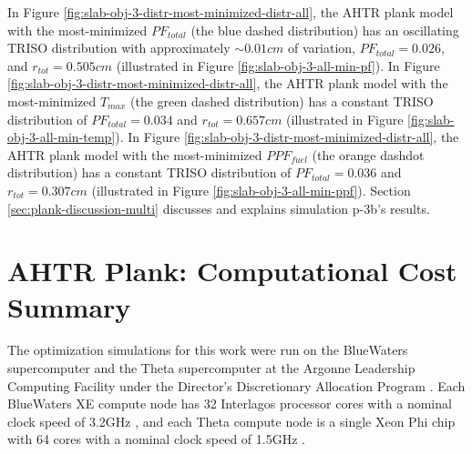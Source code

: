 In Figure \ref{fig:slab-obj-3-distr-most-minimized-distr-all}, the \gls{AHTR} plank model 
with the most-minimized $PF_{total}$ (the blue dashed distribution) has an 
oscillating TRISO distribution with approximately $\sim0.01cm$ of variation, 
$PF_{total} = 0.026$, and $r_{tot}=0.505cm$ (illustrated in Figure 
\ref{fig:slab-obj-3-all-min-pf}).
In Figure \ref{fig:slab-obj-3-distr-most-minimized-distr-all}, the \gls{AHTR} plank 
model with the most-minimized $T_{max}$ (the green dashed distribution) has a constant 
TRISO distribution of $PF_{total}=0.034$ and $r_{tot}=0.657cm$
(illustrated in Figure \ref{fig:slab-obj-3-all-min-temp}).
In Figure \ref{fig:slab-obj-3-distr-most-minimized-distr-all}, the \gls{AHTR} plank 
model with the most-minimized $PPF_{fuel}$ (the orange dashdot distribution) has a 
constant TRISO distribution of $PF_{total} = 0.036$ and $r_{tot}=0.307cm$
(illustrated in Figure \ref{fig:slab-obj-3-all-min-ppf}).
Section \ref{sec:plank-discussion-multi} discusses and explains simulation p-3b's 
results.

\section{AHTR Plank: Computational Cost Summary}
\label{sec:plank-compute-cost}
The optimization simulations for this work were run on the BlueWaters supercomputer 
\cite{ncsa_about_2017} and the Theta supercomputer at the Argonne Leadership Computing 
Facility under the Director's Discretionary Allocation Program 
\cite{noauthor_argonne_2022}. 
Each BlueWaters XE compute node has 32 Interlagos processor cores with a nominal 
clock speed of 3.2GHz \cite{ncsa_about_2017}, and each Theta compute node is a single 
Xeon Phi chip with 64 cores with a nominal clock speed of 1.5GHz 
\cite{noauthor_argonne_2022}.  

